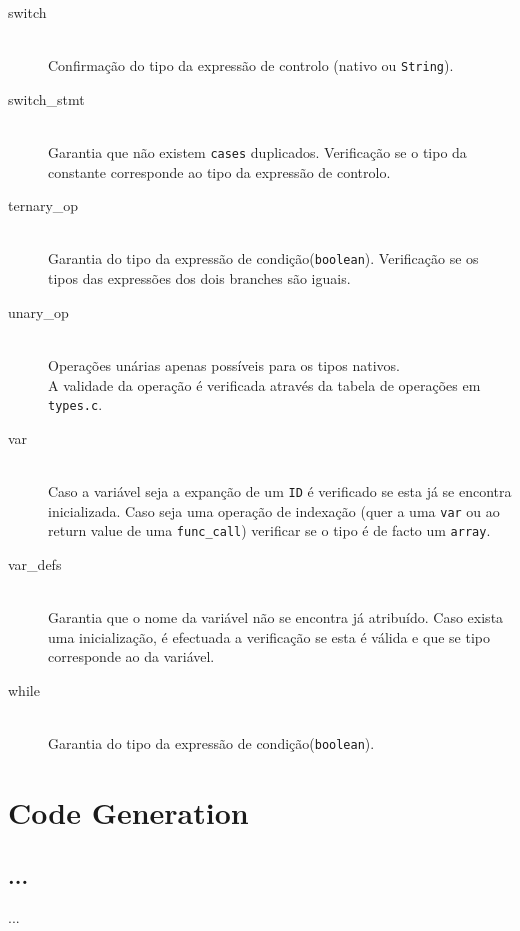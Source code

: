 \documentclass[a4paper]{article}
\begin{document}
\begin{description}
	\item [switch] \hfill \\
		Confirmação do tipo da expressão de controlo (nativo ou \texttt{String}).
	
	\item [switch\_stmt] \hfill \\
		Garantia que não existem \texttt{cases} duplicados.
		Verificação se o tipo da constante corresponde ao tipo da expressão de controlo.

	\item [ternary\_op] \hfill \\
		Garantia do tipo da expressão de condição(\texttt{boolean}).
		Verificação se os tipos das expressões dos dois branches são iguais.

	\item [unary\_op] \hfill \\
		Operações unárias apenas possíveis para os tipos nativos. \\
		A validade da operação é verificada através da tabela de operações em \texttt{types.c}.

	\item [var] \hfill \\
		Caso a variável seja a expanção de um \texttt{ID} é verificado se esta já se encontra inicializada.
		Caso seja uma operação de indexação (quer a uma \texttt{var} ou ao return value de uma \texttt{func\_call}) verificar se o tipo é de facto um \texttt{array}. 
 
	\item [var\_defs] \hfill \\
		Garantia que o nome da variável não se encontra já atribuído.
		Caso exista uma inicialização, é efectuada a verificação se esta é válida e que se tipo corresponde ao da variável.

	\item [while] \hfill \\
		Garantia do tipo da expressão de condição(\texttt{boolean}).
\end{description}

\cleardoublepage

\section{Code Generation}
\subsection{...}
\indent \indent ...
\end{document}
